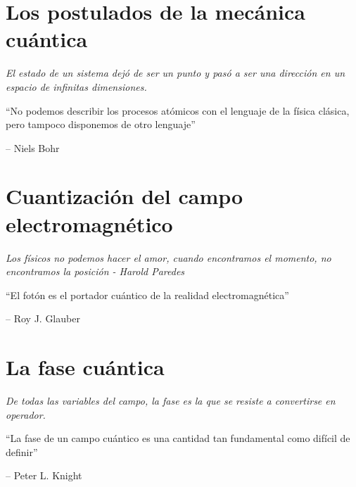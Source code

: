 \documentclass[spanish,11pt,twoside,openright]{book}
\begin{document}
	

	\chapter{Los postulados de la mecánica cuántica}\label{chap:PostuladosQM}
	\thispagestyle{empty}
	\vspace*{2cm}
	\begin{center}
		{\itshape\Huge El estado de un sistema dejó de ser un punto y pasó a ser una dirección en un espacio de infinitas dimensiones. \par}
		\vspace{1cm}
		\epigraph{``No podemos describir los procesos atómicos con el lenguaje de la física clásica, pero tampoco disponemos de otro lenguaje''}{-- Niels Bohr}
	\end{center}
	\clearpage

	

	\chapter{Cuantización del campo electromagnético}
	\thispagestyle{empty}
	\vspace*{2cm}
	\begin{center}
		{\itshape\Huge Los físicos no podemos hacer el amor, cuando encontramos el momento, no encontramos la posición - Harold Paredes\par}
		\vspace{1cm}
		\epigraph{``El fotón es el portador cuántico de la realidad electromagnética''}{-- Roy J. Glauber}
	\end{center}
	\clearpage

	

	\chapter{La fase cuántica}\label{chap:FaseCuantica}
	\thispagestyle{empty}
	\vspace*{2cm}
	\begin{center}
		{\itshape\Huge De todas las variables del campo, la fase es la que se resiste a convertirse en operador. \par}
		\vspace{1cm}
		\epigraph{``La fase de un campo cuántico es una cantidad tan fundamental como difícil de definir''}{-- Peter L. Knight}
	\end{center}
	\clearpage
\end{document}
